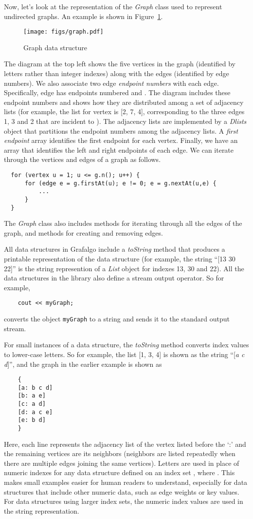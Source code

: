 \documentclass[11pt]{article}
\begin{document}
Now, let's look at the representation of the {\sl Graph} class used to represent
undirected graphs. 
An example is shown in Figure~\ref{graph}.
\begin{figure}[h]
\centerline{\texttt{[image: figs/graph.pdf]}}
\caption{Graph data structure}
\label{graph}
\end{figure}
The diagram at the top left shows the five vertices in the graph (identified by letters
rather than integer indexes) along with the edges (identified by edge numbers).
We also associate two edge {\sl endpoint numbers} with each edge. Specifically,
edge  has endpoints numbered  and . The diagram includes these
endpoint numbers and shows how they are distributed among a set of
adjacency lists (for example, the list for vertex  is [2, 7, 4], corresponding to the
three edges 1, 3 and 2 that are incident to ). The adjacency lists are implemented
by a {\sl Dlists} object that partitions the endpoint numbers among the adjacency lists.
A {\sl first endpoint} array identifies the first endpoint for each vertex.
Finally, we have an array that identifies the left and right endpoints of each edge.
We can iterate through the vertices and edges of a graph as follows.
\begin{verbatim}
  for (vertex u = 1; u <= g.n(); u++) {
      for (edge e = g.firstAt(u); e != 0; e = g.nextAt(u,e) {
          ...
      }
  }
\end{verbatim}
The {\sl Graph} class also includes methods for iterating through all the edges of the graph,
and methods for creating and removing edges.

All data structures in Grafalgo include a {\sl toString} method that produces a printable
representation of the data structure (for example, the string ``[13 30 22]'' is the string represention
of a {\sl List} object for indexes 13, 30 and 22). All the data structures in the library also define a
stream output operator. So for example,
\begin{verbatim}
    cout << myGraph;
\end{verbatim}
converts the object {\tt myGraph} to a string and sends it to the standard output stream.

For small instances of a data structure, the {\sl toString} method converts index values 
to lower-case letters. So for example, the list [1, 3, 4] is shown as the string ``[{\sl a c d}]'',
and the graph in the earlier example is shown as
\newpage
\begin{verbatim}
    {
    [a: b c d]
    [b: a e]
    [c: a d]
    [d: a c e]
    [e: b d]
    }
\end{verbatim}
Here, each line represents the adjacency list of the vertex listed before the `:' and the remaining
vertices are its neighbors (neighbors are listed repeatedly when there are multiple edges joining the same vertices).
Letters are used in place of numeric indexes for any data structure defined on an 
index set , where . 
This makes small examples easier for human readers
to understand, especially for data structures that include other numeric data,
such as edge weights or key values.
For data structures using larger index sets, the numeric index values
are used in the string representation. 
\end{document}
